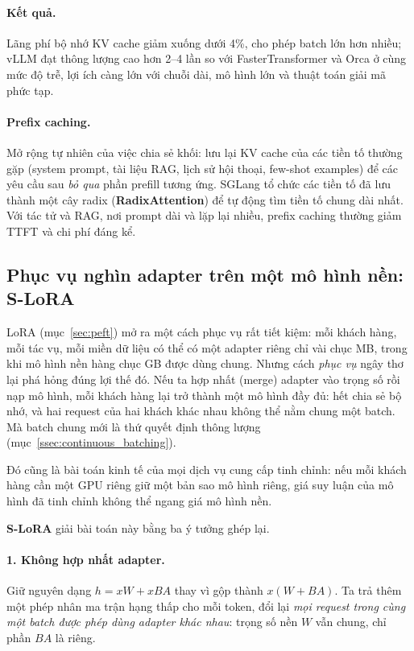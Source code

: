 \paragraph{Kết quả.} Lãng phí bộ nhớ KV cache giảm xuống dưới 4\%, cho phép batch lớn hơn nhiều; vLLM đạt thông lượng cao hơn 2--4 lần so với FasterTransformer và Orca ở cùng mức độ trễ, lợi ích càng lớn với chuỗi dài, mô hình lớn và thuật toán giải mã phức tạp.

\paragraph{Prefix caching.} Mở rộng tự nhiên của việc chia sẻ khối: lưu lại KV cache của các tiền tố thường gặp (system prompt, tài liệu RAG, lịch sử hội thoại, few-shot examples) để các yêu cầu sau \emph{bỏ qua} phần prefill tương ứng. SGLang \cite{zheng2024sglang} tổ chức các tiền tố đã lưu thành một cây radix (\textbf{RadixAttention}) để tự động tìm tiền tố chung dài nhất. Với tác tử và RAG, nơi prompt dài và lặp lại nhiều, prefix caching thường giảm TTFT và chi phí đáng kể.

\subsection{Phục vụ nghìn adapter trên một mô hình nền: S-LoRA}
\label{ssec:slora}

LoRA (mục~\ref{sec:peft}) mở ra một cách phục vụ rất tiết kiệm: mỗi khách hàng, mỗi tác vụ, mỗi miền dữ liệu có thể có một adapter riêng chỉ vài chục MB, trong khi mô hình nền hàng chục GB được dùng chung. Nhưng cách \emph{phục vụ} ngây thơ lại phá hỏng đúng lợi thế đó. Nếu ta hợp nhất (merge) adapter vào trọng số rồi nạp mô hình, mỗi khách hàng lại trở thành một mô hình đầy đủ: hết chia sẻ bộ nhớ, và hai request của hai khách khác nhau không thể nằm chung một batch. Mà batch chung mới là thứ quyết định thông lượng (mục~\ref{ssec:continuous_batching}).

Đó cũng là bài toán kinh tế của mọi dịch vụ cung cấp tinh chỉnh: nếu mỗi khách hàng cần một GPU riêng giữ một bản sao mô hình riêng, giá suy luận của mô hình đã tinh chỉnh không thể ngang giá mô hình nền.

\textbf{S-LoRA} \cite{sheng2023slora} giải bài toán này bằng ba ý tưởng ghép lại.

\paragraph{1. Không hợp nhất adapter.} Giữ nguyên dạng $h = xW + xBA$ thay vì gộp thành $x(W + BA)$. Ta trả thêm một phép nhân ma trận hạng thấp cho mỗi token, đổi lại \emph{mọi request trong cùng một batch được phép dùng adapter khác nhau}: trọng số nền $W$ vẫn chung, chỉ phần $BA$ là riêng.

